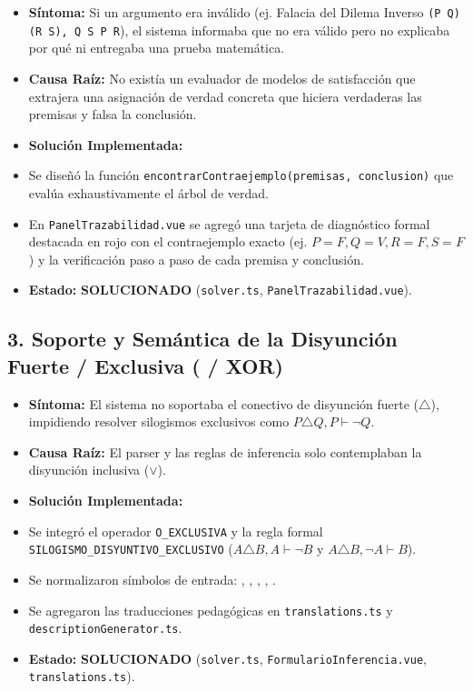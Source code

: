 \documentclass[11pt,a4paper,openany]{book}
\begin{document}
\begin{itemize}[leftmargin=*]
\item \textbf{Síntoma:} Si un argumento era inválido (ej. Falacia del Dilema Inverso \texttt{(P  Q)  (R  S), Q  S  P  R}), el sistema informaba que no era válido pero no explicaba por qué ni entregaba una prueba matemática.
\item \textbf{Causa Raíz:} No existía un evaluador de modelos de satisfacción que extrajera una asignación de verdad concreta que hiciera verdaderas las premisas y falsa la conclusión.
\item \textbf{Solución Implementada:}
\item Se diseñó la función \texttt{encontrarContraejemplo(premisas, conclusion)} que evalúa exhaustivamente el árbol de verdad.
\item En \texttt{PanelTrazabilidad.vue} se agregó una tarjeta de diagnóstico formal destacada en rojo con el contraejemplo exacto (ej. $P=F, Q=V, R=F, S=F$) y la verificación paso a paso de cada premisa y conclusión.
\item \textbf{Estado:}  \textbf{SOLUCIONADO} (\texttt{solver.ts}, \texttt{PanelTrazabilidad.vue}).
\end{itemize}

\hrulefill

\subsection{3.  Soporte y Semántica de la Disyunción Fuerte / Exclusiva (\texttt{} / XOR)}

\begin{itemize}[leftmargin=*]
\item \textbf{Síntoma:} El sistema no soportaba el conectivo de disyunción fuerte ($\triangle$), impidiendo resolver silogismos exclusivos como $P \triangle Q, P \vdash \neg Q$.
\item \textbf{Causa Raíz:} El parser y las reglas de inferencia solo contemplaban la disyunción inclusiva ($\lor$).
\item \textbf{Solución Implementada:}
\item Se integró el operador \texttt{O\_EXCLUSIVA} y la regla formal \texttt{SILOGISMO\_DISYUNTIVO\_EXCLUSIVO} ($A \triangle B, A \vdash \neg B$ y $A \triangle B, \neg A \vdash B$).
\item Se normalizaron símbolos de entrada: \texttt{}, \texttt{}, \texttt{}, \texttt{}, \texttt{}.
\item Se agregaron las traducciones pedagógicas en \texttt{translations.ts} y \texttt{descriptionGenerator.ts}.
\item \textbf{Estado:}  \textbf{SOLUCIONADO} (\texttt{solver.ts}, \texttt{FormularioInferencia.vue}, \texttt{translations.ts}).
\end{itemize}
\end{document}
